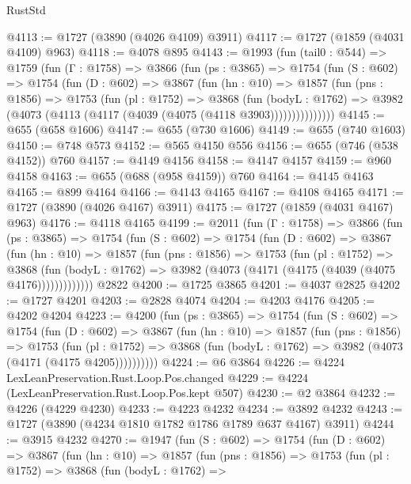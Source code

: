 \begin{lexlean}{RustStd}
\begin{coremodule}
@4113 := @1727 (@3890 (@4026 @4109) @3911)
@4117 := @1727 (@1859 (@4031 @4109) @963)
@4118 := @4078 @895
@4143 := @1993
    (fun (tail0 : @544) =>
    @1759
      (fun (Γ : @1758) =>
      @3866
        (fun (ps : @3865) =>
        @1754
          (fun (S : @602) =>
          @1754
            (fun (D : @602) =>
            @3867
              (fun (hn : @10) =>
              @1857
                (fun (pns : @1856) =>
                @1753
                  (fun (pl : @1752) =>
                  @3868
                    (fun (bodyL : @1762) =>
                    @3982 (@4073 (@4113 (@4117 (@4039 (@4075 (@4118 @3903)))))))))))))))
@4145 := @655 (@658 @1606)
@4147 := @655 (@730 @1606)
@4149 := @655 (@740 @1603)
@4150 := @748 @573
@4152 := @565 @4150 @556
@4156 := @655 (@746 (@538 @4152)) @760
@4157 := @4149 @4156
@4158 := @4147 @4157
@4159 := @960 @4158
@4163 := @655 (@688 (@958 @4159)) @760
@4164 := @4145 @4163
@4165 := @899 @4164
@4166 := @4143 @4165
@4167 := @4108 @4165
@4171 := @1727 (@3890 (@4026 @4167) @3911)
@4175 := @1727 (@1859 (@4031 @4167) @963)
@4176 := @4118 @4165
@4199 := @2011
    (fun (Γ : @1758) =>
    @3866
      (fun (ps : @3865) =>
      @1754
        (fun (S : @602) =>
        @1754
          (fun (D : @602) =>
          @3867
            (fun (hn : @10) =>
            @1857
              (fun (pns : @1856) =>
              @1753
                (fun (pl : @1752) =>
                @3868
                  (fun (bodyL : @1762) =>
                  @3982 (@4073 (@4171 (@4175 (@4039 (@4075 @4176)))))))))))))
    @2822
@4200 := @1725 @3865
@4201 := @4037 @2825
@4202 := @1727 @4201
@4203 := @2828 @4074
@4204 := @4203 @4176
@4205 := @4202 @4204
@4223 := @4200
    (fun (ps : @3865) =>
    @1754
      (fun (S : @602) =>
      @1754
        (fun (D : @602) =>
        @3867
          (fun (hn : @10) =>
          @1857
            (fun (pns : @1856) =>
            @1753
              (fun (pl : @1752) =>
              @3868 (fun (bodyL : @1762) => @3982 (@4073 (@4171 (@4175 @4205))))))))))
@4224 := @6 @3864
@4226 := @4224 LexLeanPreservation.Rust.Loop.Pos.changed
@4229 := @4224 (LexLeanPreservation.Rust.Loop.Pos.kept @507)
@4230 := @2 @3864
@4232 := @4226 (@4229 @4230)
@4233 := @4223 @4232
@4234 := @3892 @4232
@4243 := @1727 (@3890 (@4234 @1810 @1782 @1786 @1789 @637 @4167) @3911)
@4244 := @3915 @4232
@4270 := @1947
    (fun (S : @602) =>
    @1754
      (fun (D : @602) =>
      @3867
        (fun (hn : @10) =>
        @1857
          (fun (pns : @1856) =>
          @1753
            (fun (pl : @1752) =>
            @3868
              (fun (bodyL : @1762) =>

\end{coremodule}
\end{lexlean}
